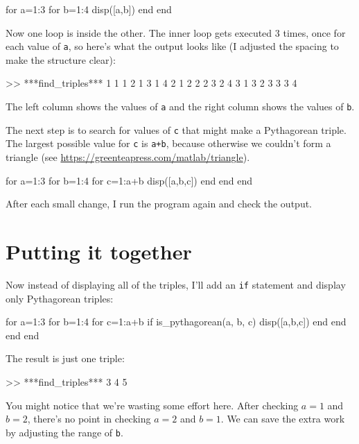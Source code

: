 \begin{code}
for a=1:3
    for b=1:4
        disp([a,b])
    end
end
\end{code}

Now one loop is inside the other.  The inner loop gets executed 3 times, once for each value of {\tt a}, so here's what the output looks like (I adjusted the spacing to make
the structure clear):

\begin{code}
>> ***find_triples***
     1     1
     1     2
     1     3
     1     4
     2     1
     2     2
     2     3
     2     4
     3     1
     3     2
     3     3
     3     4
\end{code}

The left column shows the values of {\tt a} and the right column shows the values of {\tt b}.

The next step is to search for values of {\tt c} that might make a Pythagorean triple.  The largest possible value for {\tt c} is {\tt a+b}, because otherwise we couldn't form a triangle 
(see \url{https://greenteapress.com/matlab/triangle}).

\begin{code}
for a=1:3
    for b=1:4
        for c=1:a+b
            disp([a,b,c])
        end
    end
end
\end{code}

After each small change, I run the program again and check the output.

\section{Putting it together}

Now instead of displaying all of the triples, I'll add an {\tt if} statement and display only Pythagorean triples:

\begin{code}
for a=1:3
    for b=1:4
        for c=1:a+b
            if is_pythagorean(a, b, c)
                disp([a,b,c])
            end
        end
    end
end
\end{code}

The result is just one triple:

\begin{code}
>> ***find_triples***
     3     4     5
\end{code}

You might notice that we're wasting some effort here.
After checking $a=1$ and $b=2$, there's no point in checking
$a=2$ and $b=1$.  We can save the extra work by adjusting the
range of {\tt b}.

